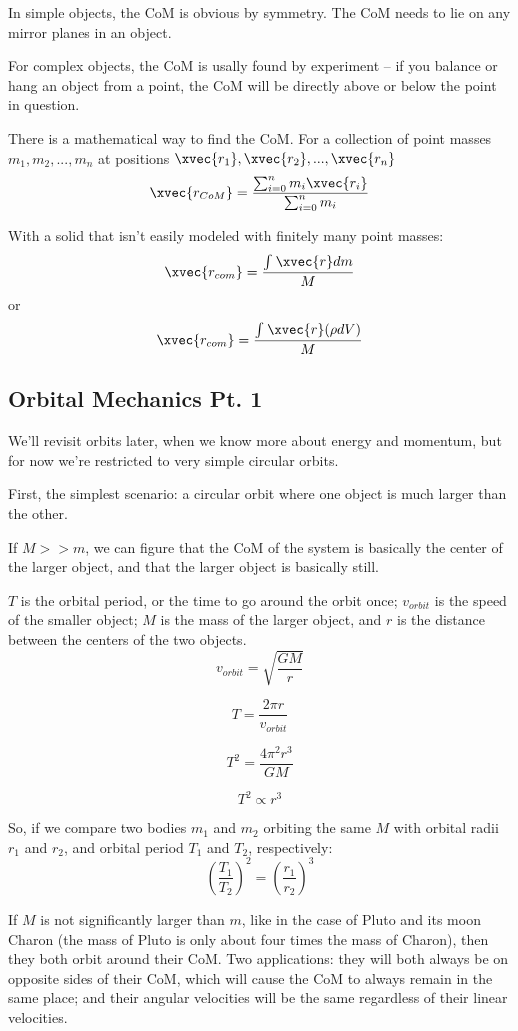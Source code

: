 \documentclass{article}
\begin{document}
In simple objects, the CoM is obvious by symmetry. The CoM needs to lie on any mirror planes in an object.

For complex objects, the CoM is usally found by experiment -- if you balance or hang an object from a point, the CoM will be directly above or below the point in question. 

There is a mathematical way to find the CoM. For a collection of point masses $m_1, m_2, ..., m_n$ at positions $\xvec{r_1}, \xvec{r_2}, ..., \xvec{r_n}$
$$\xvec{r_{CoM}} = \frac{\sum_{i=0}^{n}{m_i\xvec{r_i}}}{\sum_{i=0}^{n}{m_i}}$$

With a solid that isn't easily modeled with finitely many point masses:
$$\xvec{r_{com}}=\frac{\int_{}^{}{\xvec{r}dm}}{M}$$
or
$$\xvec{r_{com}}=\frac{\int_{}^{}{\xvec{r}(\rho dV)}}{M}$$

\subsection{Orbital Mechanics Pt. 1}
We'll revisit orbits later, when we know more about energy and momentum, but for now we're restricted to very simple circular orbits.

First, the simplest scenario: a circular orbit where one object is much larger than the other.

If $M >> m$, we can figure that the CoM of the system is basically the center of the larger object, and that the larger object is basically still.

$T$ is the orbital period, or the time to go around the orbit once; $v_{orbit}$ is the speed of the smaller object; $M$ is the mass of the larger object, and $r$ is the distance between the centers of the two objects.
$$ v_{orbit} = \sqrt{\frac{GM}{r}} $$

$$ T = \frac{2\pi r}{v_{orbit}} $$

$$ T^2 = \frac{4\pi^2 r^3}{GM} $$

$$ T^2 \propto r^3 $$

So, if we compare two bodies $m_1$ and $m_2$ orbiting the same $M$ with orbital radii $r_1$ and $r_2$, and orbital period $T_1$ and $T_2$, respectively:
$$ (\frac{T_1}{T_2})^2 = (\frac{r_1}{r_2})^3 $$

If $M$ is not significantly larger than $m$, like in the case of Pluto and its moon Charon (the mass of Pluto is only about four times the mass of Charon), then they both orbit around their CoM. Two applications: they will
both always be on opposite sides of their CoM, which will cause the CoM to always remain in the same place; and their angular velocities will be the same regardless of their linear velocities.
\end{document}
